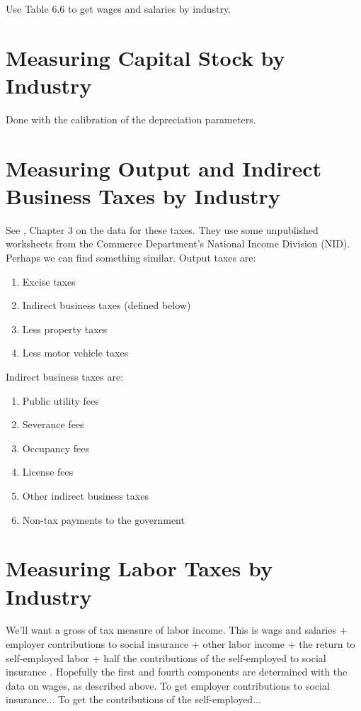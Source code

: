 \documentclass[article,11pt,letterpaper,fleqn]{article}
\theoremstyle{definition}
\numberwithin{equation}{section}
\newcommand{\cn}{\citeasnoun} %
\begin{document}
Use Table 6.6 to get wages and salaries by industry.


\section{Measuring Capital Stock by Industry}
\label{sec:step3}

Done with the calibration of the depreciation parameters.

\section{Measuring Output and Indirect Business Taxes by Industry}
\label{sec:step3}

See \cn{FR1993}, Chapter 3 on the data for these taxes.  They use some unpublished worksheets from the Commerce Department's National Income Division (NID).  Perhaps we can find something similar.  Output taxes are:

\begin{enumerate}
\item Excise taxes
\item Indirect business taxes (defined below)
\item Less property taxes
\item Less motor vehicle taxes
\end{enumerate}

Indirect business taxes are:
\begin{enumerate}
\item Public utility fees
\item Severance fees
\item Occupancy fees
\item License fees
\item Other indirect business taxes
\item Non-tax payments to the government
\end{enumerate}

\section{Measuring Labor Taxes by Industry}
\label{sec:step3}

We'll want a gross of tax measure of labor income.  This is wags and salaries + employer contributions to social insurance + other labor income + the return to self-employed labor + half the contributions of the self-employed to social insurance .  Hopefully the first and fourth components are determined with the data on wages, as described above.  To get employer contributions to social insurance...  To get the contributions of the self-employed...
\end{document}
